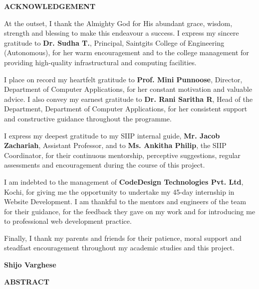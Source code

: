 \documentclass[12pt,a4paper]{report}
\begin{document}
\clearpage
\pagestyle{frontmatter}
\begin{center}
\fontsize{16pt}{18pt}\selectfont
\textbf{ACKNOWLEDGEMENT}
\end{center}
\vspace{1cm}

At the outset, I thank the Almighty God for His abundant grace, wisdom, strength and blessing to make this endeavour a success. I express my sincere gratitude to \textbf{Dr. Sudha T.}, Principal, Saintgits College of Engineering (Autonomous), for her warm encouragement and to the college management for providing high-quality infrastructural and computing facilities.

I place on record my heartfelt gratitude to \textbf{Prof. Mini Punnoose}, Director, Department of Computer Applications, for her constant motivation and valuable advice. I also convey my earnest gratitude to \textbf{Dr. Rani Saritha R}, Head of the Department, Department of Computer Applications, for her consistent support and constructive guidance throughout the programme.

I express my deepest gratitude to my SIIP internal guide, \textbf{Mr. Jacob Zachariah}, Assistant Professor, and to \textbf{Ms. Ankitha Philip}, the SIIP Coordinator, for their continuous mentorship, perceptive suggestions, regular assessments and encouragement during the course of this project.

I am indebted to the management of \textbf{CodeDesign Technologies Pvt. Ltd}, Kochi, for giving me the opportunity to undertake my 45-day internship in Website Development. I am thankful to the mentors and engineers of the team for their guidance, for the feedback they gave on my work and for introducing me to professional web development practice.

Finally, I thank my parents and friends for their patience, moral support and steadfast encouragement throughout my academic studies and this project.

\vspace{2cm}
\begin{flushright}\textbf{Shijo Varghese}\end{flushright}

\clearpage
\begin{center}
\fontsize{16pt}{18pt}\selectfont
\textbf{ABSTRACT}
\end{center}
\vspace{0.6cm}
\end{document}
